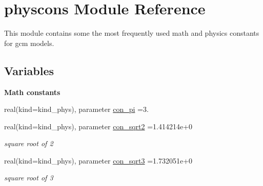 \hypertarget{namespacephyscons}{}\section{physcons Module Reference}
\label{namespacephyscons}


This module contains some the most frequently used math and physics constants for gcm models.  


\subsection*{Variables}
\begin{Indent}{\bf Math constants}\par
\begin{DoxyCompactItemize}
\item 
real(kind=kind\+\_\+phys), parameter \hyperlink{namespacephyscons_aeb280391512de20933b4af3593a8ba38}{con\+\_\+pi} =3.
\item 
real(kind=kind\+\_\+phys), parameter \hyperlink{namespacephyscons_a2cf7f8b3a5721fe3b0be2afe5f19a352}{con\+\_\+sqrt2} =1.\+414214e+0
\begin{DoxyCompactList}\small\item\em square root of 2 \end{DoxyCompactList}\item 
real(kind=kind\+\_\+phys), parameter \hyperlink{namespacephyscons_ac8a4f35ffde9c6d239cd11a9158e4cc6}{con\+\_\+sqrt3} =1.\+732051e+0
\begin{DoxyCompactList}\small\item\em square root of 3 \end{DoxyCompactList}\end{DoxyCompactItemize}
\end{Indent}
